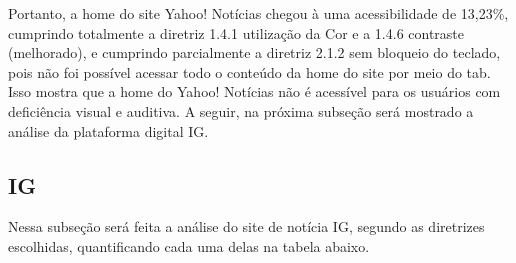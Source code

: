 \documentclass[a4paper]{article}
\begin{document}
\begin{titlepage}
Portanto, a home do site Yahoo! Notícias chegou à uma acessibilidade de 13,23\%, cumprindo totalmente a diretriz 1.4.1 utilização da Cor e a 1.4.6 contraste (melhorado), e cumprindo parcialmente a diretriz 2.1.2 sem bloqueio do teclado, pois não foi possível acessar todo o conteúdo da home do site por meio do tab. Isso mostra que a home do Yahoo! Notícias não é acessível para os usuários com deficiência visual e auditiva. A seguir, na próxima subseção será mostrado a análise da plataforma digital IG.

\subsection{IG}

Nessa subseção será feita a análise do site de notícia IG, segundo as diretrizes escolhidas, quantificando cada uma delas na tabela abaixo.\\


\end{titlepage}
\end{document}
